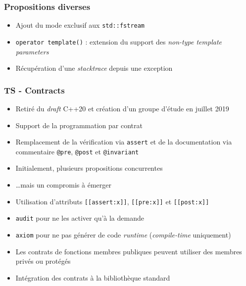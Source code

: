 \documentclass[C++.tex]{subfiles}
\begin{document}
\begin{frame}[fragile]
	\frametitle{Propositions diverses}
	\begin{itemize}
		\item Ajout du mode exclusif aux \lstinline|std::fstream|
		\item \lstinline|operator template()| : extension du support des \textit{non-type template parameters}
		\item Récupération d'une \textit{stacktrace} depuis une exception
	\end{itemize}
\end{frame}
		
\begin{frame}[fragile]
	\frametitle{TS - Contracts}
	\begin{itemize}
		\item Retiré du \textit{draft} C++20 et création d'un groupe d'étude en juillet 2019


		\item Support de la programmation par contrat
		\item Remplacement de la vérification via \lstinline|assert| et de la documentation via commentaire \lstinline|@pre|, \lstinline|@post| et \lstinline|@invariant|
		\item Initialement, plusieurs propositions \og concurrentes\fg{}
		\item \ldots{}mais un compromis à émerger
		\item Utilisation d'attributs \lstinline|[[assert:x]]|, \lstinline|[[pre:x]]| et \lstinline|[[post:x]]|


		\item \lstinline|audit| pour ne les activer qu'à la demande
		\item \lstinline|axiom| pour ne pas générer de code \textit{runtime} (\textit{compile-time} uniquement)
		\item Les contrats de fonctions membres publiques peuvent utiliser des membres privés ou protégés
		\item Intégration des contrats à la bibliothèque standard
	\end{itemize}
\end{frame}
\end{document}
